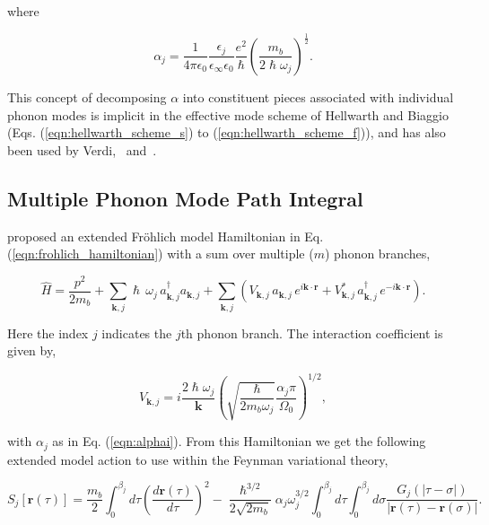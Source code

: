where

\begin{equation}
\alpha_j = \frac{1}{4\pi\epsilon_0}  \frac{\epsilon_j}{\epsilon_{\infty}\epsilon_{0}} \frac{e^2}{\hslash} \left( \frac{m_b}{2\hslash\omega_j} \right)^{\frac{1}{2}}.
    \label{eqn:alphai}
\end{equation}

This concept of decomposing $\alpha$ into constituent pieces associated with individual phonon modes is implicit in the effective mode scheme of Hellwarth and Biaggio (Eqs. (\ref{eqn:hellwarth_scheme_s}) to (\ref{eqn:hellwarth_scheme_f})), and has also been used by Verdi,~\cite{verbist_extended_1992} and~\cite{devreese_many-body_2010}.

\subsection{Multiple Phonon Mode Path Integral}
\label{subsec:3-1-1}

\cite{verbist_extended_1992} proposed an extended Fr\"ohlich model Hamiltonian in Eq. (\ref{eqn:frohlich_hamiltonian}) with a sum over multiple ($m$) phonon branches,

\begin{equation}
    \hat{H} = \frac{p^2}{2m_b} + \sum_{\mathbf{k}, j} \hslash \, \omega_{j} \, a_{\mathbf{k}, j}^\dagger a_{\mathbf{k}, j}
    + \sum_{\mathbf{k}, j} ( V_{\mathbf{k}, j} \, a_{\mathbf{k}, j} \, e^{i\mathbf{k} \cdot \mathbf{r}} + V_{\mathbf{k}, j}^* \, a_{\mathbf{k}, j}^\dagger \, e^{-i\mathbf{k} \cdot \mathbf{r}}) .
\label{eqn:multifrohlich}
\end{equation}

Here the index $j$ indicates the $j$th phonon branch. The interaction coefficient is given by,

\begin{equation}
    V_{\mathbf{k}, j} = i\frac{2 \hslash \omega_j}{\mathbf{k}} \left(\sqrt{\frac{\hslash}{2 m_b \omega_j}} \frac{\alpha_j \pi}{\Omega_0} \right)^{1/2},
\end{equation}

with $\alpha_j$ as in Eq. (\ref{eqn:alphai}). From this Hamiltonian we get the following extended model action to use within the Feynman variational theory,

\begin{equation}
        S_j[\mathbf{r}(\tau)] =
        \frac{m_b}{2}\int^{\beta_j}_0 d\tau \left(\frac{d\mathbf{r}(\tau)}{d\tau}\right)^2 -
        \frac{\hslash^{3/2}}{2\sqrt{2 m_b}} \alpha_j \omega_{j}^{3/2} \int^{\beta_j}_0 d\tau \int^{\beta_j}_0 d\sigma \frac{G_j(|\tau - \sigma|)}{|\mathbf{r}(\tau) - \mathbf{r}(\sigma)|} .
\label{eqn:multiaction}
\end{equation}

